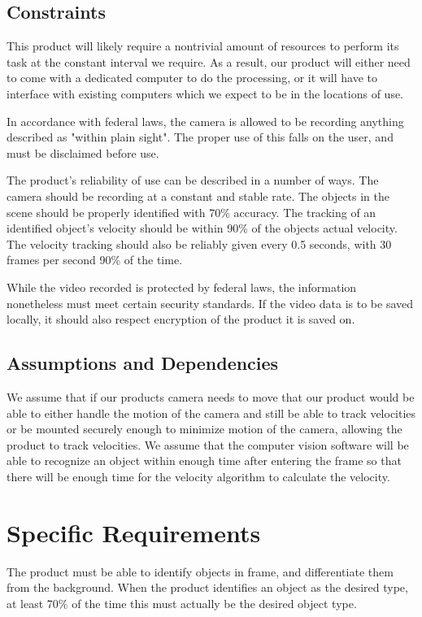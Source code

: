 \documentclass[onecolumn, draftclsnofoot,10pt, compsoc]{IEEEtran}
\begin{document}
\subsection{Constraints}
This product will likely require a nontrivial amount of resources to perform its task at the constant interval we require.
As a result, our product will either need to come with a dedicated computer to do the processing, or it will have to interface with existing computers which we expect to be in the locations of use.

In accordance with federal laws, the camera is allowed to be recording anything described as "within plain sight".
The proper use of this falls on the user, and must be disclaimed before use.

The product's reliability of use can be described in a number of ways.
The camera should be recording at a constant and stable rate.
The objects in the scene should be properly identified with 70\% accuracy.
The tracking of an identified object's velocity should be within 90\% of the objects actual velocity.
The velocity tracking should also be reliably given every 0.5 seconds, with 30 frames per second 90\% of the time.

While the video recorded is protected by federal laws, the information nonetheless must meet certain security standards.
If the video data is to be saved locally, it should also respect encryption of the product it is saved on.

\subsection{Assumptions and Dependencies}
We assume that if our products camera needs to move that our product would be able to either handle the motion of the camera and still be able to track velocities or be mounted securely enough to minimize motion of the camera, allowing the product to track velocities.
We assume that the computer vision software will be able to recognize an object within enough time after entering the frame so that there will be enough time for the velocity algorithm to calculate the velocity.

\section{Specific Requirements}
The product must be able to identify objects in frame, and differentiate them from the background.
When the product identifies an object as the desired type, at least 70\% of the time this must actually be the desired object type.
\end{document}

